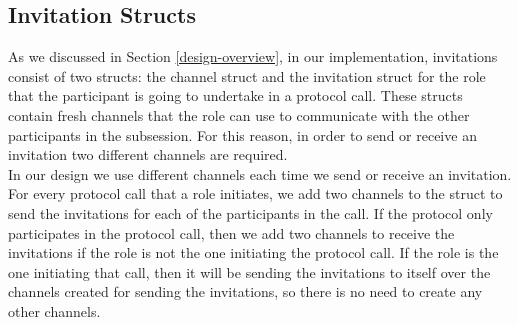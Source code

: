 \documentclass[12pt,twoside]{report}
\begin{document}
\subsection{Invitation Structs}

As we discussed in Section \ref{design-overview}, in our implementation, invitations consist of two structs: the channel struct and the invitation struct for the role that the participant is going to undertake in a protocol call. These structs contain fresh channels that the role can use to communicate with the other participants in the subsession. For this reason, in order to send or receive an invitation two different channels are required.\\

In our design we use different channels each time we send or receive an invitation. For every protocol call that a role initiates, we add two channels to the struct to send the invitations for each of the participants in the call. If the protocol only participates in the protocol call, then we add two channels to receive the invitations if the role is not the one initiating the protocol call. If the role is the one initiating that call, then it will be sending the invitations to itself over the channels created for sending the invitations, so there is no need to create any other channels.\\
\end{document}
